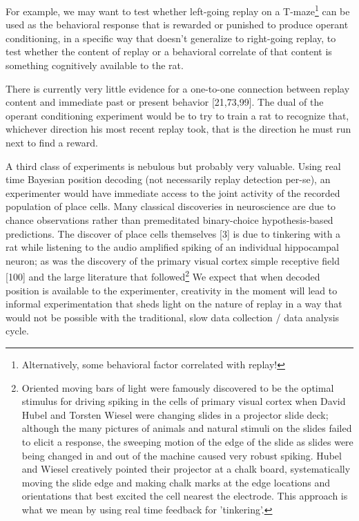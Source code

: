 \documentclass[]{article}
\begin{document}
For example, we may want to test whether left-going replay on a
T-maze\footnote{Alternatively, some behavioral factor correlated with
  replay!} can be used as the behavioral response that is rewarded or
punished to produce operant conditioning, in a specific way that doesn't
generalize to right-going replay, to test whether the content of replay
or a behavioral correlate of that content is something cognitively
available to the rat.

There is currently very little evidence for a one-to-one connection
between replay content and immediate past or present behavior
{[}21,73,99{]}. The dual of the operant conditioning experiment would be
to try to train a rat to recognize that, whichever direction his most
recent replay took, that is the direction he must run next to find a
reward.

A third class of experiments is nebulous but probably very valuable.
Using real time Bayesian position decoding (not necessarily replay
detection per-se), an experimenter would have immediate access to the
joint activity of the recorded population of place cells. Many classical
discoveries in neuroscience are due to chance observations rather than
premeditated binary-choice hypothesis-based predictions. The discover of
place cells themselves {[}3{]} is due to tinkering with a rat while
listening to the audio amplified spiking of an individual hippocampal
neuron; as was the discovery of the primary visual cortex simple
receptive field {[}100{]} and the large literature that
followed\footnote{Oriented moving bars of light were famously discovered
  to be the optimal stimulus for driving spiking in the cells of primary
  visual cortex when David Hubel and Torsten Wiesel were changing slides
  in a projector slide deck; although the many pictures of animals and
  natural stimuli on the slides failed to elicit a response, the
  sweeping motion of the edge of the slide as slides were being changed
  in and out of the machine caused very robust spiking. Hubel and Wiesel
  creatively pointed their projector at a chalk board, systematically
  moving the slide edge and making chalk marks at the edge locations and
  orientations that best excited the cell nearest the electrode. This
  approach is what we mean by using real time feedback for 'tinkering'.}
We expect that when decoded position is available to the experimenter,
creativity in the moment will lead to informal experimentation that
sheds light on the nature of replay in a way that would not be possible
with the traditional, slow data collection / data analysis cycle.
\end{document}
